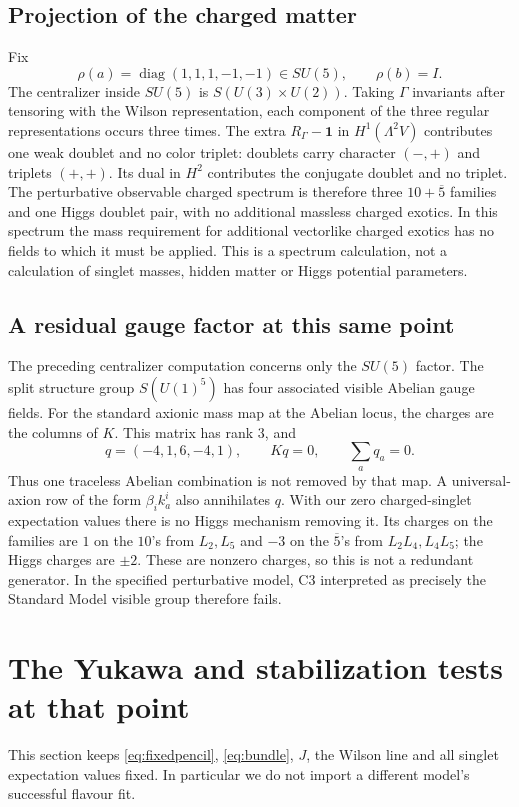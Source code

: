 \subsection{Projection of the charged matter}
Fix
\[
 \rho(a)=\operatorname{diag}(1,1,1,-1,-1)\in SU(5),\qquad\rho(b)=I.
\]
The centralizer inside $SU(5)$ is $S(U(3)\times U(2))$.
Taking $\Gamma$ invariants after tensoring with the Wilson representation,
each component of the three regular representations occurs three times.
The extra $R_\Gamma-\mathbf1$ in $H^1(\Lambda^2V)$ contributes one
weak doublet and no color triplet: doublets carry character $(-,+)$
and triplets $(+,+)$. Its dual in $H^2$ contributes the conjugate
doublet and no triplet. The perturbative observable charged spectrum
is therefore three $10+\overline5$ families and one Higgs doublet pair,
with no additional massless charged exotics. In this spectrum the
mass requirement for additional vectorlike charged exotics has no fields
to which it must be applied. This is a spectrum calculation, not a
calculation of singlet masses, hidden matter or Higgs potential parameters.

\subsection{A residual gauge factor at this same point}\label{sec:extraU1}
The preceding centralizer computation concerns only the $SU(5)$ factor.
The split structure group $S(U(1)^5)$ has four associated visible Abelian
gauge fields. For the standard axionic mass map at the Abelian locus,
the charges are the columns of $K$. This matrix has rank $3$, and
\begin{equation}\label{eq:extrau1}
 q=(-4,1,6,-4,1),\qquad Kq=0,\qquad\sum_aq_a=0.
\end{equation}
Thus one traceless Abelian combination is not removed by that map.
A universal-axion row of the form $\beta_i k_a^i$ also annihilates $q$.
With our zero charged-singlet expectation values there is no Higgs
mechanism removing it. Its charges on the families are $1$ on the $10$'s
from $L_2,L_5$ and $-3$ on the $\overline5$'s from $L_2L_4,L_4L_5$;
the Higgs charges are $\pm2$. These are nonzero charges, so this is not
a redundant generator. In the specified perturbative model, C3 interpreted
as precisely the Standard Model visible group therefore fails.

\section{The Yukawa and stabilization tests at that point}\label{sec:pointfailure}
This section keeps \eqref{eq:fixedpencil}, \eqref{eq:bundle}, $J$, the
Wilson line and all singlet expectation values fixed. In particular we
do not import a different model's successful flavour fit.

